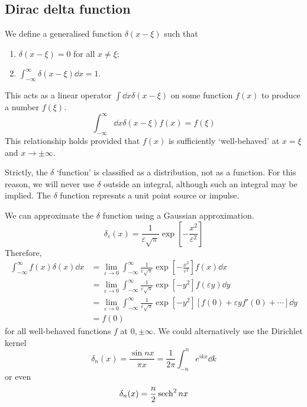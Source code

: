 \subsection{Dirac delta function}
\begin{definition}
	We define a generalised function \( \delta(x - \xi) \) such that
	\begin{enumerate}
		\item \( \delta(x-\xi) = 0 \) for all \( x \neq \xi \);
		\item \( \int_{-\infty}^\infty \delta(x-\xi) \dd{x} = 1 \).
	\end{enumerate}
	This acts as a linear operator \( \int \dd{x} \delta(x - \xi) \) on some function \( f(x) \) to produce a number \( f(\xi) \).
	\[
		\int_{-\infty}^\infty \dd{x} \delta(x-\xi) f(x) = f(\xi)
	\]
	This relationship holds provided that \( f(x) \) is sufficiently `well-behaved' at \( x=\xi \) and \( x\to\pm \infty \).
\end{definition}
\begin{remark}
	Strictly, the \( \delta \) `function' is classified as a distribution, not as a function.
	For this reason, we will never use \( \delta \) outside an integral, although such an integral may be implied.
	The \( \delta \) function represnts a unit point source or impulse.
\end{remark}
We can approximate the \( \delta \) function using a Gaussian approximation.
\[
	\delta_\varepsilon(x) = \frac{1}{\varepsilon \sqrt{\pi}} \exp[-\frac{x^2}{\varepsilon^2}]
\]
Therefore,
\begin{align*}
	\int_{-\infty}^\infty f(x) \delta(x) \dd{x} & = \lim_{\varepsilon \to 0} \int_{-\infty}^\infty \frac{1}{\varepsilon \sqrt{\pi}} \exp[-\frac{x^2}{\varepsilon^2}] f(x) \dd{x}            \\
	                                            & = \lim_{\varepsilon \to 0} \int_{-\infty}^\infty \frac{1}{\varepsilon \sqrt{\pi}} \exp[-y^2] f(\varepsilon y) \dd{y}                      \\
	                                            & = \lim_{\varepsilon \to 0} \int_{-\infty}^\infty \frac{1}{\varepsilon \sqrt{\pi}} \exp[-y^2] [f(0) + \varepsilon y f'(0) + \cdots] \dd{y} \\
	                                            & = f(0)
\end{align*}
for all well-behaved functions \( f \) at \( 0, \pm \infty \).
We could alternatively use the Dirichlet kernel
\[
	\delta_n(x) = \frac{\sin n x}{\pi x} = \frac{1}{2\pi} \int_{-n}^n e^{ikx} \dd{k}
\]
or even
\[
	\delta_n(x) = \frac{n}{2} \sech^2 nx
\]

